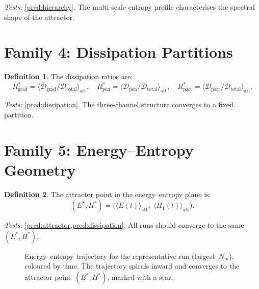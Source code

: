 \documentclass[11pt,twoside,openright]{book}
\theoremstyle{definition}
\newtheorem{definition}{Definition}[chapter]
\theoremstyle{plain}
\theoremstyle{definition}
\theoremstyle{remark}
\newcommand{\Dgrad}{\mathcal{D}_{\mathrm{grad}}}
\newcommand{\Dpen}{\mathcal{D}_{\mathrm{pen}}}
\newcommand{\Dpart}{\mathcal{D}_{\mathrm{part}}}
\newcommand{\Dtotal}{\mathcal{D}_{\mathrm{total}}}
\newcommand{\att}{\mathrm{att}}
\begin{document}
\noindent\emph{Tests:} \cref{pred:hierarchy}. The multi-scale entropy profile characterises the spectral shape of the attractor.

\section{Family 4: Dissipation Partitions}\label{sec:fam-dissipation}

\begin{definition}\label{def:dissipation-part}
The dissipation ratios are:
\begin{equation}\label{eq:dissip-ratios}
R_{\mathrm{grad}}^* = \bigl\langle \Dgrad/\Dtotal \bigr\rangle_\att, \quad
R_{\mathrm{pen}}^* = \bigl\langle \Dpen/\Dtotal \bigr\rangle_\att, \quad
R_{\mathrm{part}}^* = \bigl\langle \Dpart/\Dtotal \bigr\rangle_\att.
\end{equation}
\end{definition}

\noindent\emph{Tests:} \cref{pred:dissipation}. The three-channel structure converges to a fixed partition.

\section{Family 5: Energy--Entropy Geometry}\label{sec:fam-EH}

\begin{definition}\label{def:EH}
The attractor point in the energy--entropy plane is:
\begin{equation}\label{eq:EH}
(E^*, H^*) = \bigl(\langle E(t) \rangle_\att,\; \langle H_1(t) \rangle_\att\bigr).
\end{equation}
\end{definition}

\noindent\emph{Tests:} \cref{pred:attractor,pred:dissipation}. All runs should converge to the same \((E^*, H^*)\).

\begin{figure}[ht]
\centering
\caption{Energy--entropy trajectory for the representative run (largest~\(N_m\)), coloured by time. The trajectory spirals inward and converges to the attractor point~\((E^*, H^*)\), marked with a star.}
\label{fig:EH-trajectory}
\end{figure}
\end{document}
